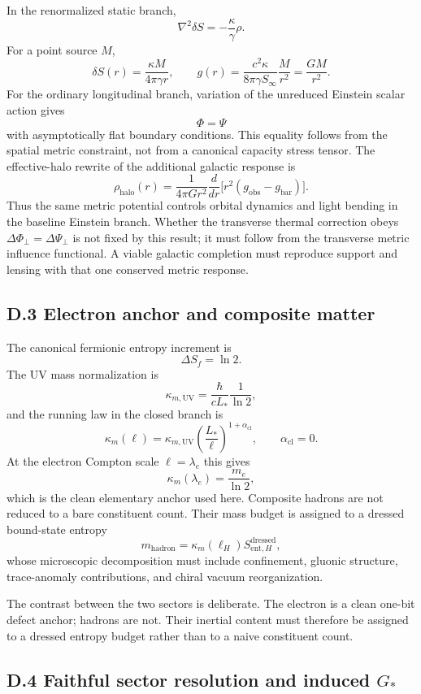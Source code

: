 \documentclass[11pt]{article}
\begin{document}
In the renormalized static branch,
\[
\nabla^2\delta S=-\frac{\kappa}{\gamma}\rho.
\]
For a point source $M$,
\[
\delta S(r)=\frac{\kappa M}{4\pi\gamma r},
\qquad
g(r)=\frac{c^2\kappa}{8\pi\gamma S_\infty}\frac{M}{r^2}
=
\frac{GM}{r^2}.
\]
For the ordinary longitudinal branch, variation of the unreduced Einstein scalar action gives
\[
\Phi=\Psi
\]
with asymptotically flat boundary conditions. This equality follows from the spatial metric constraint, not from a canonical capacity stress tensor. The effective-halo rewrite of the additional galactic response is
\[
\rho_{\mathrm{halo}}(r)=\frac{1}{4\pi Gr^2}\frac{d}{dr}\Big[r^2(g_{\mathrm{obs}}-g_{\mathrm{bar}})\Big].
\]
Thus the same metric potential controls orbital dynamics and light bending in the baseline Einstein branch. Whether the transverse thermal correction obeys $\Delta\Phi_\perp=\Delta\Psi_\perp$ is not fixed by this result; it must follow from the transverse metric influence functional. A viable galactic completion must reproduce support and lensing with that one conserved metric response.

\subsection*{D.3 Electron anchor and composite matter}

The canonical fermionic entropy increment is
\[
\Delta S_f=\ln 2.
\]
The UV mass normalization is
\[
\kappa_{m,\mathrm{UV}}=\frac{\hbar}{cL_*}\frac{1}{\ln 2},
\]
and the running law in the closed branch is
\[
\kappa_m(\ell)=\kappa_{m,\mathrm{UV}}\left(\frac{L_*}{\ell}\right)^{1+\alpha_{\mathrm{cl}}},
\qquad
\alpha_{\mathrm{cl}}=0.
\]
At the electron Compton scale $\ell=\lambda_e$ this gives
\[
\kappa_m(\lambda_e)=\frac{m_e}{\ln 2},
\]
which is the clean elementary anchor used here. Composite hadrons are not reduced to a bare constituent count. Their mass budget is assigned to a dressed bound-state entropy
\[
m_{\mathrm{hadron}}=\kappa_m(\ell_H)S_{\mathrm{ent},H}^{\mathrm{dressed}},
\]
whose microscopic decomposition must include confinement, gluonic structure, trace-anomaly contributions, and chiral vacuum reorganization.

The contrast between the two sectors is deliberate. The electron is a clean one-bit defect anchor; hadrons are not. Their inertial content must therefore be assigned to a dressed entropy budget rather than to a naive constituent count.

\subsection*{D.4 Faithful sector resolution and induced \texorpdfstring{$G_*$}{G*}}
\end{document}

